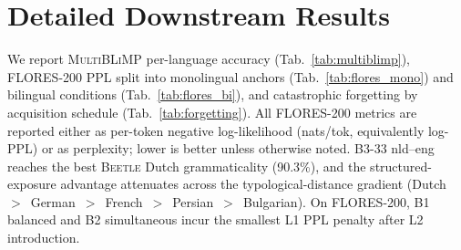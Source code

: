 \newpage
\clearpage 

\section{Detailed Downstream Results}\label{sec:downstream}

We report \beetle \textsc{MultiBLiMP} per-language accuracy (Tab.~\ref{tab:multiblimp}), \textsc{FLORES-200} PPL split into monolingual anchors (Tab.~\ref{tab:flores_mono}) and bilingual conditions (Tab.~\ref{tab:flores_bi}), and catastrophic forgetting by acquisition schedule (Tab.~\ref{tab:forgetting}). All \textsc{FLORES-200} metrics are reported either as per-token negative log-likelihood (nats/tok, equivalently log-PPL) or as perplexity; lower is better unless otherwise noted. B3-33 nld--eng reaches the best \textsc{Beetle} Dutch grammaticality (90.3\%), and the structured-exposure advantage attenuates across the typological-distance gradient (Dutch~$>$~German~$>$~French~$>$~Persian~$>$~Bulgarian). On FLORES-200, B1 balanced and B2 simultaneous incur the smallest L1 PPL penalty after L2 introduction. \label{appcomp:phase}

